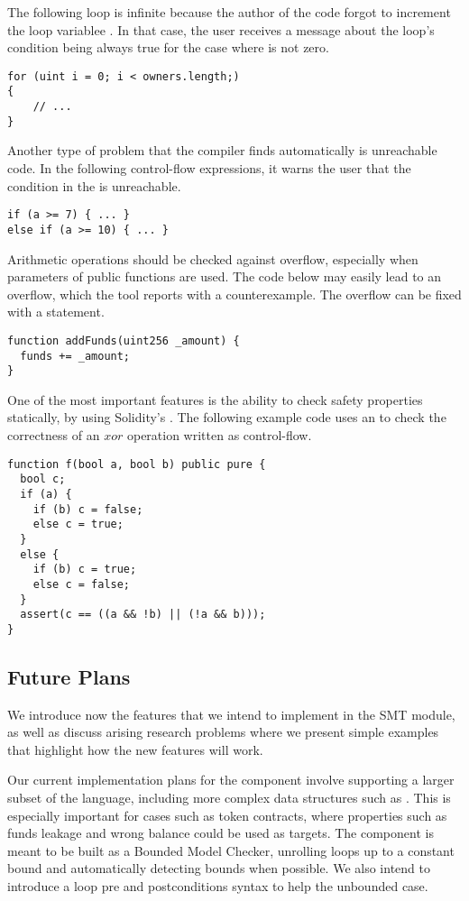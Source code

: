 The following loop is infinite because the author of the code
forgot to increment the loop variablee .
%
In that case, the user receives a message about the loop's condition being
always true for the case where  is not zero.

\begin{verbatim}
for (uint i = 0; i < owners.length;)
{
    // ...
}
\end{verbatim}

Another type of problem that the compiler finds automatically is unreachable
code.
%
In the following control-flow expressions, it warns the user that the condition
in the  is unreachable.

\begin{verbatim}
if (a >= 7) { ... }
else if (a >= 10) { ... }
\end{verbatim}

Arithmetic operations should be checked against overflow, especially when
parameters of public functions are used.
%
The code below may easily lead to an overflow, which the tool reports with a
counterexample.
%
The overflow can be fixed with a  statement.

\begin{verbatim}
function addFunds(uint256 _amount) {
  funds += _amount;
}
\end{verbatim}

One of the most important features is the ability to check safety properties
statically, by using Solidity's .
%
The following example code uses an  to check the correctness of an
$xor$ operation written as control-flow.

\begin{verbatim}
function f(bool a, bool b) public pure {
  bool c;
  if (a) {
    if (b) c = false;
    else c = true;
  }
  else {
    if (b) c = true;
    else c = false;
  }
  assert(c == ((a && !b) || (!a && b)));
}
\end{verbatim}

\subsection{Future Plans}

We introduce now the features that we intend to implement in the SMT module, as
well as discuss arising research problems where we present simple examples that
highlight how the new features will work.

Our current implementation plans for the component involve supporting
a larger subset of the language, including more complex data structures
such as .
%
This is especially important for cases such as token contracts, where
properties such as funds leakage and wrong balance could be used as targets.
%
The component is meant to be built as a Bounded Model Checker, unrolling loops
up to a constant bound and automatically detecting bounds when possible.
%
We also intend to introduce a loop pre and postconditions syntax to help the
unbounded case.

